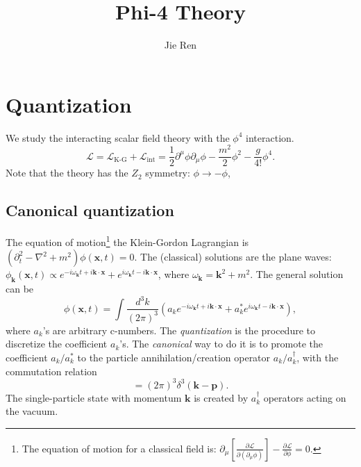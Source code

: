 \documentclass[aps,prb,superscriptaddress,nofootinbib]{revtex4}
\begin{document}
\title{Phi-4 Theory}
\author{Jie Ren}


\maketitle



\tableofcontents

\section{Quantization}
We study the interacting scalar field theory with the $\phi^4$ interaction.
\begin{equation*}
	\mathcal L = \mathcal L_\text{K-G} + \mathcal L_{\mathrm{int}}
	= \frac{1}{2}\partial^\mu \phi \partial_\mu \phi -\frac{m^2}{2}\phi^2 -\frac{g}{4!}\phi^4.
\end{equation*}
Note that the theory has the $Z_2$ symmetry: $\phi \rightarrow -\phi$, 


\subsection{Canonical quantization}
The equation of motion\footnote{The equation of motion for a classical field is: $\partial_\mu \left[\frac{\partial \mathcal L}{\partial(\partial_\mu \phi)}\right] - \frac{\partial \mathcal L}{\partial \phi} = 0$.} the Klein-Gordon Lagrangian is $(\partial_t^2-\nabla^2+m^2)\phi(\bm x,t) = 0$.
The (classical) solutions are the plane waves: $\phi_{\bm k}(\bm x, t) \propto e^{-i\omega_{\bm{k}}t+i\bm{k}\cdot\bm{x}} + e^{i\omega_{\bm{k}}t-i\bm{k}\cdot\bm{x}}$, where $\omega_{\bm{k}}=\bm{k}^2+m^2$.
The general solution can be
\begin{equation*}
	\phi(\bm x,t) = \int \frac{d^{3} k}{(2\pi)^{3}} \left(
		a_{k}e^{-i\omega_{\bm{k}}t+i\bm{k}\cdot\bm{x}} + 
		a^*_{k}e^{i\omega_{\bm{k}}t-i\bm{k}\cdot\bm{x}} 
	\right),
\end{equation*}
where $a_k$'s are arbitrary c-numbers.
The \textit{quantization} is the procedure to discretize the coefficient $a_k$'s.
The \textit{canonical} way to do it is to promote the coefficient $a_{k}/a_{k}^*$ to the particle annihilation/creation operator $a_{k}/a_{k}^\dagger$, with the commutation relation
\begin{equation}
	[a_{k}, a_{p}^\dagger] = (2\pi)^{3} \delta^{3}(\bm{k}-\bm{p}).
\end{equation}
The single-particle state with momentum $\bm k$ is created by $a_{k}^{\dagger}$ operators acting on the vacuum.
\end{document}
